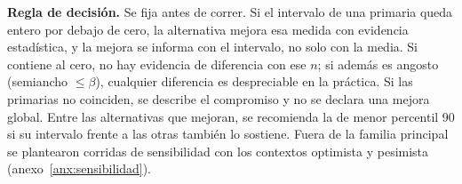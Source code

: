 \textbf{Regla de decisión.} Se fija antes de correr. Si el intervalo de una primaria queda entero por debajo de cero, la alternativa
mejora esa medida con evidencia estadística, y la mejora se informa con el intervalo, no solo con la
media. Si contiene al cero, no hay evidencia de diferencia con ese $n$; si además es angosto (semiancho
$\le \beta$), cualquier diferencia es despreciable en la práctica. Si las primarias no coinciden, se
describe el compromiso y no se declara una mejora global. Entre las alternativas que mejoran, se
recomienda la de menor percentil 90 si su intervalo frente a las otras también lo sostiene. Fuera de la familia principal se plantearon corridas de
sensibilidad con los contextos optimista y pesimista (anexo~\ref{anx:sensibilidad}).
